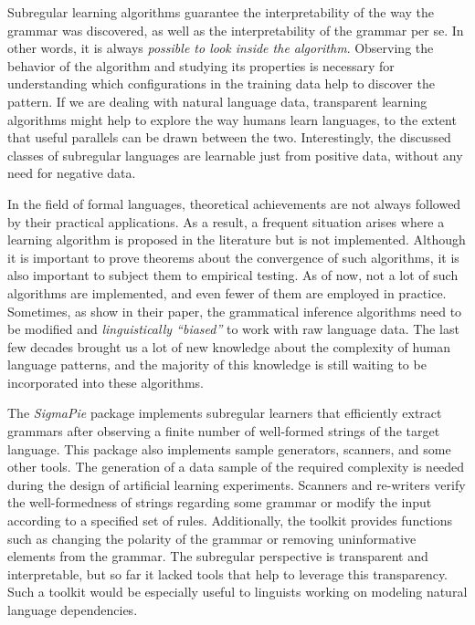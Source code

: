 Subregular learning algorithms guarantee the interpretability of the way the grammar was discovered, as well as the interpretability of the grammar per se.
In other words, it is always \emph{possible to look inside the algorithm}.
Observing the behavior of the algorithm and studying its properties is necessary for understanding which configurations in the training data help to discover the pattern.
If we are dealing with natural language data, transparent learning algorithms might help to explore the way humans learn languages, to the extent that useful parallels can be drawn between the two.
Interestingly, the discussed classes of subregular languages are learnable just from positive data, without any need for negative data.


In the field of formal languages, theoretical achievements are not always followed by their practical applications.
As a result, a frequent situation arises where a learning algorithm is proposed in the literature but is not implemented.
Although it is important to prove theorems about the convergence of such algorithms, it is also important to subject them to empirical testing.
As of now, not a lot of such algorithms are implemented, and even fewer of them are employed in practice.
Sometimes, as \cite{GildeaJurafsky1996} show in their paper, the grammatical inference algorithms need to be modified and \emph{linguistically ``biased''} to work with raw language data.
The last few decades brought us a lot of new knowledge about the complexity of human language patterns, and the majority of this knowledge is still waiting to be incorporated into these algorithms.


The \emph{SigmaPie} package implements subregular learners that efficiently extract grammars after observing a finite number of well-formed strings of the target language.
This package also implements sample generators, scanners, and some other tools.
The generation of a data sample of the required complexity is needed during the design of artificial learning experiments.
Scanners and re-writers verify the well-formedness of strings regarding some grammar or modify the input according to a specified set of rules.
Additionally, the toolkit provides functions such as changing the polarity of the grammar or removing uninformative elements from the grammar.
The subregular perspective is transparent and interpretable, but so far it lacked tools that help to leverage this transparency.
Such a toolkit would be especially useful to linguists working on modeling natural language dependencies.


